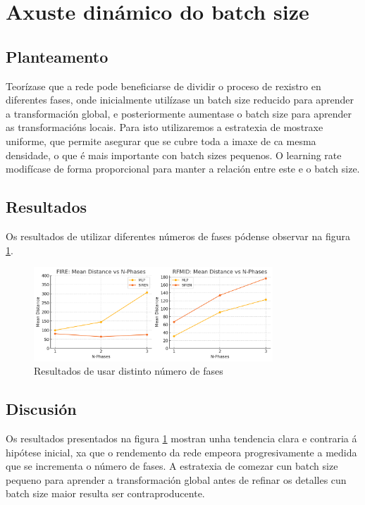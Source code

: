 \section{Axuste dinámico do batch size}
\label{sec:Dynamic batch size}

\subsection{Planteamento}
\label{subsec:Planteamento-phases}

Teorízase que a rede pode beneficiarse de dividir o proceso de rexistro en diferentes fases, onde inicialmente utilízase un batch size reducido para aprender a transformación global, e posteriormente aumentase o batch size para aprender as transformacións locais.
Para isto utilizaremos a estratexia de mostraxe uniforme, que permite asegurar que se cubre toda a imaxe de ca mesma densidade, o que é mais importante con batch sizes pequenos. O learning rate modifícase de forma proporcional para manter a relación entre este e o batch size.

\subsection{Resultados}
\label{subsec:Resultados-phases}

Os resultados de utilizar diferentes números de fases pódense observar na figura \ref{fig:nphases}.
\begin{figure}[tbp]
    \centering
    \includegraphics[width=0.8\textwidth]{imaxes/lottery/nphases.png}
    \caption{Resultados de usar distinto número de fases}
    \label{fig:nphases}
\end{figure}


\subsection{Discusión}
\label{subsec:Discusion-phases}

Os resultados presentados na figura \ref{fig:nphases} mostran unha tendencia clara e contraria á hipótese inicial, xa que o rendemento da rede empeora progresivamente a medida que se incrementa o número de fases. A estratexia de comezar cun batch size pequeno para aprender a transformación global antes de refinar os detalles cun batch size maior resulta ser contraproducente.

